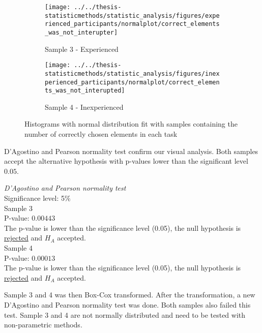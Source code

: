 \begin{figure}[h!]
	\centering
	\begin{subfigure}[b]{0.48\textwidth}
		\centering
		\texttt{[image: ../../thesis-statisticmethods/statistic\_analysis/figures/experienced\_participants/normalplot/correct\_elements\_was\_not\_interupter]}
		\caption{Sample 3 - Experienced}
		\label{fig:correctelementswasnotinterupter_ex}
	\end{subfigure}
	\begin{subfigure}[b]{0.48\textwidth}
		\centering
		\texttt{[image: ../../thesis-statisticmethods/statistic\_analysis/figures/inexperienced\_participants/normalplot/correct\_elements\_was\_not\_interupted]}
		\caption{Sample 4 - Inexperienced}
		\label{fig:correctelementswasnotinterupted_inex}
	\end{subfigure}
	\caption{Histograms with normal distribution fit with samples containing the number of correctly chosen elements in each task}
\end{figure}

D'Agostino and Pearson normality test confirm our visual analysis. Both samples accept the alternative hypothesis with p-values lower than the significant level $0.05$. \\[0.3cm]

\begin{center}
	\begin{tcolorbox}[width=0.8\textwidth]
		\centering
		\textit{D'Agostino and Pearson normality test}\\
		Significance level: 5\%  \\[0.5cm]
		
		Sample 3\\
		P-value: $0.00443$\\
		The p-value is lower than the significance level (0.05), the null hypothesis is \underline{rejected} and $H_A$ accepted.\\[0.5cm]
		
		Sample 4\\
		P-value: $0.00013$ \\
		The p-value is lower than the significance level (0.05), the null hypothesis is \underline{rejected} and $H_A$ accepted.\\[0.5cm]
	\end{tcolorbox} 
\end{center}

\vspace{0.3cm}

Sample 3 and 4 was then Box-Cox transformed. After the transformation, a new D'Agostino and Pearson normality test was done. Both samples also failed this test. Sample 3 and 4 are not normally distributed and need to be tested with non-parametric methods. 

